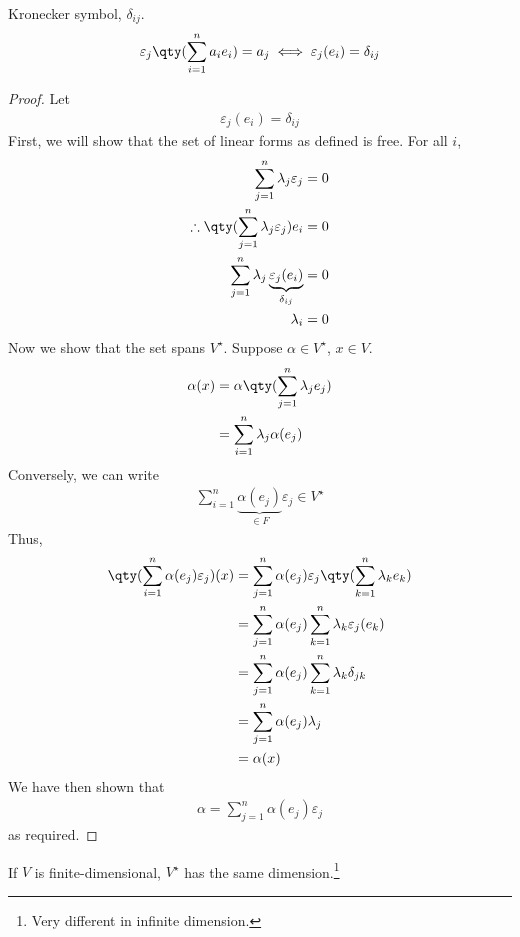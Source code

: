 \begin{remark}
	Kronecker symbol, $\delta_{ij}$.
	\begin{align*}
		\varepsilon_j \qty( \sum_{i=1}^n a_i e_i ) = a_j \iff \varepsilon_j (e_i) = \delta_{ij}
	\end{align*} 
\end{remark} 

\begin{proof}
	Let
	\begin{align*}
		\varepsilon_j (e_i) = \delta_{ij}
	\end{align*}
	First, we will show that the set of linear forms as defined is free.
	For all $i$,
	\begin{align*}
		\sum_{j=1}^n \lambda_j \varepsilon_j &= 0 \\
		\therefore \qty( \sum_{j=1}^n \lambda_j \varepsilon_j ) e_i & = 0 \\
		\sum_{j=1}^n \lambda_j \underbrace{\varepsilon_j(e_i)}_{\delta_{ij}} &= 0 \\
		\lambda_i &= 0
	\end{align*}
	Now we show that the set spans $V^\star$.
	Suppose $\alpha \in V^\star$, $x \in V$.
	\begin{align*}
		\alpha(x) & = \alpha\qty(\sum_{j=1}^n \lambda_j e_j) \\
		&= \sum_{i=1}^n \lambda_j \alpha(e_j)
	\end{align*}
	Conversely, we can write
	\begin{align*}
		\sum_{i=1}^n \underbrace{\alpha(e_j)}_{\in F} \varepsilon_j \in V^\star
	\end{align*}
	Thus,
	\begin{align*}
		\qty( \sum_{i=1}^n \alpha(e_j) \varepsilon_j) (x) & = \sum_{j=1}^n \alpha(e_j) \varepsilon_j\qty(\sum_{k=1}^n \lambda_k e_k) \\
        &= \sum_{j=1}^n \alpha(e_j) \sum_{k=1}^n \lambda_k \varepsilon_j(e_k) \\
		& = \sum_{j=1}^n \alpha(e_j) \sum_{k=1}^n \lambda_k \delta_{jk} \\
		&= \sum_{j=1}^n \alpha(e_j) \lambda_j \\
		&= \alpha(x)
	\end{align*}
	We have then shown that
	\begin{align*}
		\alpha = \sum_{j=1}^n \alpha(e_j) \varepsilon_j
	\end{align*}
	as required.
\end{proof}
\begin{corollary}
	If $V$ is finite-dimensional, $V^\star$ has the same dimension.\footnote{Very different in infinite dimension.}
\end{corollary}
